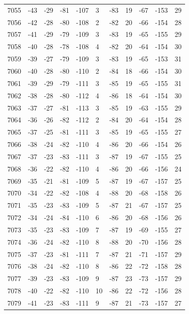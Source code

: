 \begin{table}[H]
\begin{tabular}{lllllllllll}
7055 & -43 & -29 & -81 & -107 & 3 & -83 & 19 & -67 & -153 & 29 \\
7056 & -42 & -28 & -80 & -108 & 2 & -82 & 20 & -66 & -154 & 28 \\
7057 & -41 & -29 & -79 & -109 & 3 & -83 & 19 & -65 & -155 & 29 \\
7058 & -40 & -28 & -78 & -108 & 4 & -82 & 20 & -64 & -154 & 30 \\
7059 & -39 & -27 & -79 & -109 & 3 & -83 & 19 & -65 & -153 & 31 \\
7060 & -40 & -28 & -80 & -110 & 2 & -84 & 18 & -66 & -154 & 30 \\
7061 & -39 & -29 & -79 & -111 & 3 & -85 & 19 & -65 & -155 & 31 \\
7062 & -38 & -28 & -80 & -112 & 4 & -86 & 18 & -64 & -154 & 30 \\
7063 & -37 & -27 & -81 & -113 & 3 & -85 & 19 & -63 & -155 & 29 \\
7064 & -36 & -26 & -82 & -112 & 2 & -84 & 20 & -64 & -154 & 28 \\
7065 & -37 & -25 & -81 & -111 & 3 & -85 & 19 & -65 & -155 & 27 \\
7066 & -38 & -24 & -82 & -110 & 4 & -86 & 20 & -66 & -154 & 26 \\
7067 & -37 & -23 & -83 & -111 & 3 & -87 & 19 & -67 & -155 & 25 \\
7068 & -36 & -22 & -82 & -110 & 4 & -86 & 20 & -66 & -156 & 24 \\
7069 & -35 & -21 & -81 & -109 & 5 & -87 & 19 & -67 & -157 & 25 \\
7070 & -34 & -22 & -82 & -108 & 4 & -88 & 20 & -68 & -158 & 26 \\
7071 & -35 & -23 & -83 & -109 & 5 & -87 & 21 & -67 & -157 & 25 \\
7072 & -34 & -24 & -84 & -110 & 6 & -86 & 20 & -68 & -156 & 26 \\
7073 & -35 & -23 & -83 & -109 & 7 & -87 & 19 & -69 & -155 & 27 \\
7074 & -36 & -24 & -82 & -110 & 8 & -88 & 20 & -70 & -156 & 28 \\
7075 & -37 & -23 & -81 & -111 & 7 & -87 & 21 & -71 & -157 & 29 \\
7076 & -38 & -24 & -82 & -110 & 8 & -86 & 22 & -72 & -158 & 28 \\
7077 & -39 & -23 & -83 & -109 & 9 & -87 & 23 & -73 & -157 & 29 \\
7078 & -40 & -22 & -82 & -110 & 10 & -86 & 22 & -72 & -156 & 28 \\
7079 & -41 & -23 & -83 & -111 & 9 & -87 & 21 & -73 & -157 & 27 \\

\end{tabular}
\end{table}
